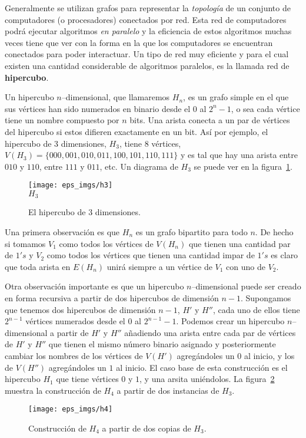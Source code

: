 \begin{ejemplo}[El Hipercubo.]
Generalmente se utilizan grafos para representar la \emph{topología} de un conjunto de computadores (o procesadores) conectados por red.
Esta red de computadores podrá ejecutar algoritmos \emph{en paralelo} y la eficiencia de estos algoritmos muchas veces tiene que ver con la forma en la que los computadores se encuentran conectados para poder interactuar.
Un tipo de red muy eficiente y para el cual existen una cantidad considerable de algoritmos paralelos, es la llamada red de {\bf hipercubo}.

Un hipercubo $n$--dimensional, que llamaremos $H_n$, es un grafo simple en el que sus vértices han sido numerados en binario desde el $0$ al $2^n-1$, o sea cada vértice tiene un nombre compuesto por $n$ bits.
Una arista conecta a un par de vértices del hipercubo si estos difieren exactamente en un bit.
Así por ejemplo, el hipercubo de 3 dimensiones, $H_3$, tiene $8$ vértices, $V(H_3)=\{000,001,010,011,100,101,110,111\}$ y es tal que hay una arista entre $010$ y $110$, entre $111$ y $011$, etc.
Un diagrama de $H_3$ se puede ver en la figura~\ref{fig:h3}.
\begin{figure}[h!]
\centering
\texttt{[image: eps\_imgs/h3]}\\
$H_3$
\caption{El hipercubo de 3 dimensiones.}
\label{fig:h3}
\end{figure}

Una primera observación es que $H_n$ es un grafo bipartito para todo $n$.
De hecho si tomamos $V_1$ como todos los vértices de $V(H_n)$ que tienen una cantidad par de $1's$ y $V_2$ como todos los vértices que tienen una cantidad impar de $1's$ es claro que toda arista en $E(H_n)$ unirá siempre a un vértice de $V_1$ con uno de $V_2$.

Otra observación importante es que un hipercubo $n$--dimensional puede ser creado en forma recursiva a partir de dos hipercubos de dimensión $n-1$.
Supongamos que tenemos dos hipercubos de dimensión $n-1$, $H'$ y $H''$, cada uno de ellos tiene $2^{n-1}$ vértices numerados desde el $0$ al $2^{n-1}-1$.
Podemos crear un hipercubo $n$--dimensional a partir de $H'$ y $H''$ añadiendo una arista entre cada par de vértices de $H'$ y $H''$ que tienen el mismo número binario asignado y posteriormente cambiar los nombres de los vértices de $V(H')$ agregándoles un $0$ al inicio, y los de $V(H'')$ agregándoles un $1$ al inicio.
El caso base de esta construcción es el hipercubo $H_1$ que tiene vértices $0$ y $1$, y una arsita uniéndolos.
La figura~\ref{fig:h4} muestra la construcción de $H_4$ a partir de dos instancias de $H_3$.
\begin{figure}[h!]
\centering
\texttt{[image: eps\_imgs/h4]}
\caption{Construcción de $H_4$ a partir de dos copias de $H_3$.}
\label{fig:h4}
\end{figure}


\end{ejemplo}
